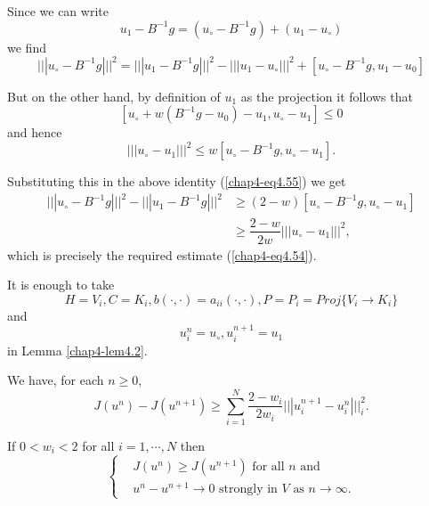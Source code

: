 Since we can write
$$
u_{1} - B^{-1} g = (u_{\circ} - B^{-1} g) + (u_{1} - u_{\circ})
$$
we find
\begin{equation*}
||| u_{\circ} - B^{-1} g |||^{2} = ||| u_{1} - B^{-1} g |||^{2} - ||| u_{1} - u_{\circ} |||^{2} + [u_{\circ} - B^{-1} g, u_{1} - u_{0}] \tag{4.55}\label{chap4-eq4.55}
\end{equation*}

But on the other hand, by definition of $u_{1}$ as the projection it follows that
$$
[u_{\circ} + w(B^{-1} g - u_{0}) - u_{1}, u_{\circ} - u_{1}] \leq 0
$$
and hence
$$
||| u_{\circ} - u_{1} |||^{2} \leq w [u_{\circ} - B^{-1} g, u_{\circ} - u_{1}].
$$\pageoriginale

Substituting this in the above identity (\ref{chap4-eq4.55}) we get
\begin{align*}
||| u_{\circ} - B^{-1} g |||^{2} - ||| u_{1} - B^{-1} g |||^{2} & \geq (2-w) [u_{\circ} - B^{-1} g, u_{\circ} - u_{1}]\\
& \geq \dfrac{2-w}{2w} |||u_{\circ}-u_{1}|||^{2},
\end{align*}
which is precisely the required estimate (\ref{chap4-eq4.54}).


\medskip
{} It is enough to take
$$
H = V_{i}, C = K_{i}, b(\cdot , \cdot) = a_{ii} (\cdot , \cdot), P = P_{i} = Proj \{V_{i} \to K_{i}\}
$$
and
$$
u_{i}^{n} = u_{\circ}, u_{i}^{n+1} = u_{1}
$$
in Lemma \ref{chap4-lem4.2}.

\begin{corollary}\label{chap4-coro4.1}
We have, for each $n \geq 0$,
\begin{equation*}
J(u^{n}) - J(u^{n+1}) \geq \sum_{i=1}^{N} \dfrac{2-w_{i}}{2w_{i}} ||| u_{i}^{n+1} - u_{i}^{n} |||_{i}^{2}.\tag{4.56}\label{chap4-eq4.56}
\end{equation*}
\end{corollary}

\begin{proposition}\label{chap4-prop4.2}
If $0 < w_{i} < 2$  for all  $i = 1, \cdots, N$  then 
\begin{equation*}
\begin{cases}
& J(u^{n}) \geq J(u^{n+1}) \text{ for all $n$ and }\\
& u^{n} - u^{n+1} \to 0 \text{ strongly in $V$ as } n \to \infty.\tag{4.57}\label{chap4-eq4.57}
\end{cases}
\end{equation*}
\end{proposition}

